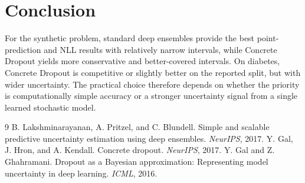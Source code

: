 \documentclass[10pt,twocolumn]{article}
\begin{document}
\section{Conclusion}
For the synthetic problem, standard deep ensembles provide the best
point-prediction and NLL results with relatively narrow intervals, while
Concrete Dropout yields more conservative and better-covered intervals.
On diabetes, Concrete Dropout is competitive or slightly better on the
reported split, but with wider uncertainty.  The practical choice therefore
depends on whether the priority is computationally simple accuracy or a
stronger uncertainty signal from a single learned stochastic model.

\begin{thebibliography}{9}
 B. Lakshminarayanan, A. Pritzel, and C. Blundell.
 Simple and scalable predictive uncertainty estimation using deep ensembles.
 \emph{NeurIPS}, 2017.
 Y. Gal, J. Hron, and A. Kendall.
 Concrete dropout.
 \emph{NeurIPS}, 2017.
 Y. Gal and Z. Ghahramani.
 Dropout as a Bayesian approximation: Representing model uncertainty in deep
 learning.
 \emph{ICML}, 2016.
\end{thebibliography}
\end{document}
